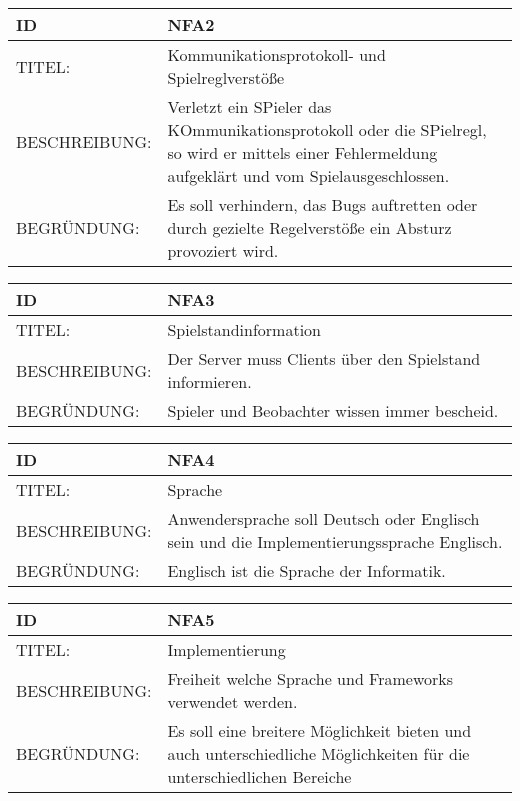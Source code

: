 \documentclass{uulm-assignment}
\begin{document}
    \begin{tabularx}{\textwidth}{|l|X |} \hline
        \textbf{ID} & \textbf{NFA2} \\
        \hline
        TITEL: &  Kommunikationsprotokoll- und Spielreglverstöße\\
        \hline
        BESCHREIBUNG: &  Verletzt ein SPieler das KOmmunikationsprotokoll oder die SPielregl, so wird er mittels einer Fehlermeldung aufgeklärt und vom Spielausgeschlossen.\\
        \hline
        BEGRÜNDUNG: &  Es soll verhindern, das Bugs auftretten oder durch gezielte Regelverstöße ein Absturz provoziert wird.\\
        \hline
    \end{tabularx}

    \begin{tabularx}{\textwidth}{|l|X |} \hline
        \textbf{ID} & \textbf{NFA3} \\
        \hline
        TITEL: &  Spielstandinformation\\
        \hline
        BESCHREIBUNG: &  Der Server muss Clients über den Spielstand informieren.\\
        \hline
        BEGRÜNDUNG: &  Spieler und Beobachter wissen immer bescheid.\\
        \hline
    \end{tabularx}

     \begin{tabularx}{\textwidth}{|l|X |} \hline
        \textbf{ID} & \textbf{NFA4} \\
        \hline
        TITEL: &  Sprache\\
        \hline
        BESCHREIBUNG: &  Anwendersprache soll Deutsch oder Englisch sein und die Implementierungssprache Englisch.\\
        \hline
        BEGRÜNDUNG: &  Englisch ist die Sprache der Informatik.\\
        \hline
    \end{tabularx}

    \begin{tabularx}{\textwidth}{|l|X |} \hline
        \textbf{ID} & \textbf{NFA5} \\
        \hline
        TITEL: &  Implementierung\\
        \hline
        BESCHREIBUNG: &  Freiheit welche Sprache und Frameworks verwendet werden. \\
        \hline
        BEGRÜNDUNG: &  Es soll eine breitere Möglichkeit bieten und auch unterschiedliche Möglichkeiten für die unterschiedlichen Bereiche\\
        \hline
    \end{tabularx}
\end{document}

